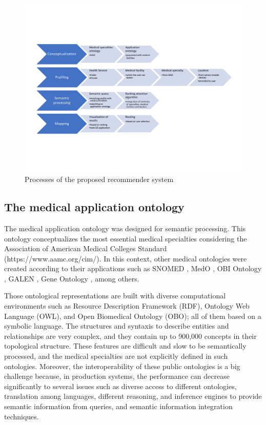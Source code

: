 \documentclass[sustainability,article,submit,pdftex,moreauthors]{Definitions/mdpi}
\begin{document}
\begin{figure}
	\begin{center}
		\includegraphics[width=1.0\textwidth, trim={1cm 5cm 1cm 5cm}, clip]{Fig01.pdf}
	\end{center}
	\caption{Processes of the proposed recommender system\label{fig:arquitectura}}
\end{figure}

\subsection{The medical application ontology}

The medical application ontology was designed for semantic processing. This ontology conceptualizes the most essential medical specialties considering the Association of American Medical Colleges Standard (https://www.aamc.org/cim/). In this context, other medical ontologies were created according to their applications such as SNOMED \citep{cornet2008forty}, MedO \citep{fujita2010multiviews}, OBI Ontology \citep{bandrowski2016ontology}, GALEN \citep{rector2006ontological}, Gene Ontology \citep{gene2019gene}, among others.

Those ontological representations are built with diverse computational environments such as Resource Description Framework (RDF), Ontology Web Language (OWL), and Open Biomedical Ontology (OBO); all of them based on a symbolic language. The structures and syntaxis to describe entities and relationships are very complex, and they contain up to 900,000 concepts in their topological structure. These features are difficult and slow to be semantically processed, and the medical specialties are not explicitly defined in such ontologies. Moreover, the interoperability of these public ontologies is a big challenge because, in production systems, the performance can decrease significantly to several issues such as diverse access to different ontologies, translation among languages, different reasoning, and inference engines to provide semantic information from queries, and semantic information integration techniques.
\end{document}
